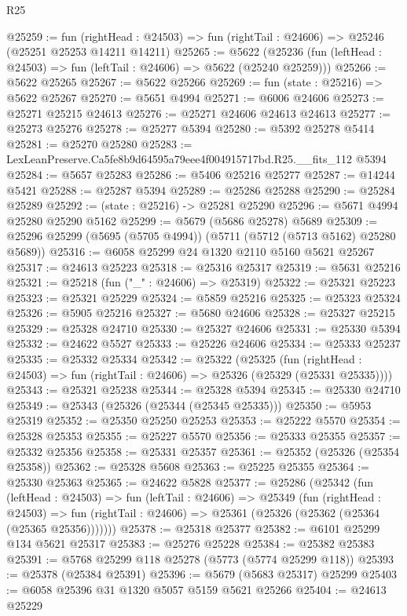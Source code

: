 \begin{lexlean}{R25}
\begin{coremodule}
@25259 := fun (rightHead : @24503) =>
  fun (rightTail : @24606) => @25246 (@25251 @25253 @14211 @14211)
@25265 := @5622
    (@25236 (fun (leftHead : @24503) => fun (leftTail : @24606) => @5622 (@25240 @25259)))
@25266 := @5622 @25265
@25267 := @5622 @25266
@25269 := fun (state : @25216) => @5622 @25267
@25270 := @5651 @4994
@25271 := @6006 @24606
@25273 := @25271 @25215 @24613
@25276 := @25271 @24606 @24613 @24613
@25277 := @25273 @25276
@25278 := @25277 @5394
@25280 := @5392 @25278 @5414
@25281 := @25270 @25280
@25283 := LexLeanPreserve.Ca5fe8b9d64595a79eee4f004915717bd.R25.__fits_112 @5394
@25284 := @5657 @25283
@25286 := @5406 @25216 @25277
@25287 := @14244 @5421
@25288 := @25287 @5394
@25289 := @25286 @25288
@25290 := @25284 @25289
@25292 := (state : @25216) -> @25281 @25290
@25296 := @5671 @4994 @25280 @25290 @5162
@25299 := @5679 (@5686 @25278) @5689
@25309 := @25296 @25299 (@5695 (@5705 @4994)) (@5711 (@5712 (@5713 @5162) @25280 @5689))
@25316 := @6058 @25299 @24 @1320 @2110 @5160 @5621 @25267
@25317 := @24613 @25223
@25318 := @25316 @25317
@25319 := @5631 @25216
@25321 := @25218 (fun ("_" : @24606) => @25319)
@25322 := @25321 @25223
@25323 := @25321 @25229
@25324 := @5859 @25216
@25325 := @25323 @25324
@25326 := @5905 @25216
@25327 := @5680 @24606
@25328 := @25327 @25215
@25329 := @25328 @24710
@25330 := @25327 @24606
@25331 := @25330 @5394
@25332 := @24622 @5527
@25333 := @25226 @24606
@25334 := @25333 @25237
@25335 := @25332 @25334
@25342 := @25322
    (@25325
      (fun (rightHead : @24503) => fun (rightTail : @24606) => @25326 (@25329 (@25331 @25335))))
@25343 := @25321 @25238
@25344 := @25328 @5394
@25345 := @25330 @24710
@25349 := @25343 (@25326 (@25344 (@25345 @25335)))
@25350 := @5953 @25319
@25352 := @25350 @25250 @25253
@25353 := @25222 @5570
@25354 := @25328 @25353
@25355 := @25227 @5570
@25356 := @25333 @25355
@25357 := @25332 @25356
@25358 := @25331 @25357
@25361 := @25352 (@25326 (@25354 @25358))
@25362 := @25328 @5608
@25363 := @25225 @25355
@25364 := @25330 @25363
@25365 := @24622 @5828
@25377 := @25286
    (@25342
      (fun (leftHead : @24503) =>
      fun (leftTail : @24606) =>
      @25349
        (fun (rightHead : @24503) =>
        fun (rightTail : @24606) => @25361 (@25326 (@25362 (@25364 (@25365 @25356)))))))
@25378 := @25318 @25377
@25382 := @6101 @25299 @134 @5621 @25317
@25383 := @25276 @25228
@25384 := @25382 @25383
@25391 := @5768 @25299 @118 @25278 (@5773 (@5774 @25299 @118))
@25393 := @25378 (@25384 @25391)
@25396 := @5679 (@5683 @25317) @25299
@25403 := @6058 @25396 @31 @1320 @5057 @5159 @5621 @25266
@25404 := @24613 @25229

\end{coremodule}
\end{lexlean}
